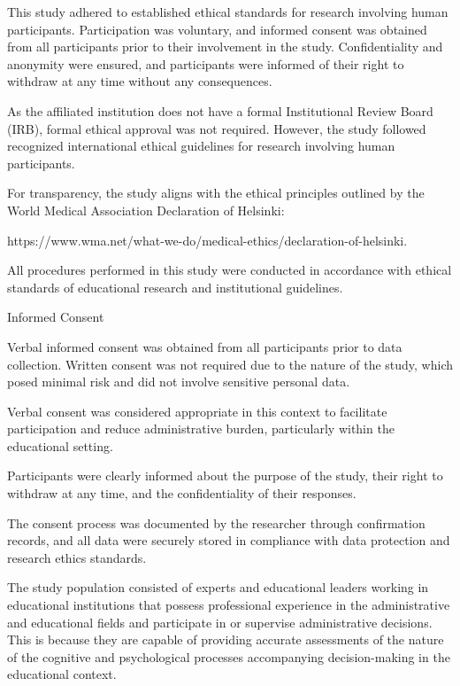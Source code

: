 \documentclass[10pt]{NSP1}
\begin{document}
This study adhered to established ethical standards for research involving human participants. Participation was voluntary, and informed consent was obtained from all participants prior to their involvement in the study. Confidentiality and anonymity were ensured, and participants were informed of their right to withdraw at any time without any consequences.

As the affiliated institution does not have a formal Institutional Review Board (IRB), formal ethical approval was not required. However, the study followed recognized international ethical guidelines for research involving human participants.

For transparency, the study aligns with the ethical principles outlined by the World Medical Association Declaration of Helsinki:

https://www.wma.net/what-we-do/medical-ethics/declaration-of-helsinki.

All procedures performed in this study were conducted in accordance with ethical standards of educational research and institutional guidelines.

Informed Consent

Verbal informed consent was obtained from all participants prior to data collection. Written consent was not required due to the nature of the study, which posed minimal risk and did not involve sensitive personal data.

Verbal consent was considered appropriate in this context to facilitate participation and reduce administrative burden, particularly within the educational setting.

Participants were clearly informed about the purpose of the study, their right to withdraw at any time, and the confidentiality of their responses.

The consent process was documented by the researcher through confirmation records, and all data were securely stored in compliance with data protection and research ethics standards.

\par\medskip{}\smallskip

The study population consisted of experts and educational leaders working in educational institutions that possess professional experience in the administrative and educational fields and participate in or supervise administrative decisions. This is because they are capable of providing accurate assessments of the nature of the cognitive and psychological processes accompanying decision-making in the educational context.
\end{document}
